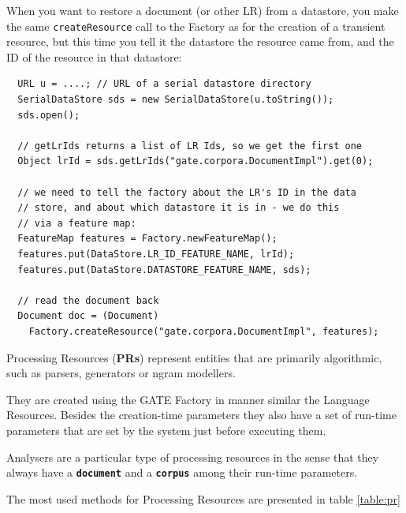 When you want to restore a document (or other LR) from a datastore, you make
the same {\tt createResource} call to the Factory as for the creation of a
transient resource, but this time you tell it the datastore the resource
came from, and the ID of the resource in that datastore:
\begin{lstlisting}
  URL u = ....; // URL of a serial datastore directory
  SerialDataStore sds = new SerialDataStore(u.toString());
  sds.open();

  // getLrIds returns a list of LR Ids, so we get the first one
  Object lrId = sds.getLrIds("gate.corpora.DocumentImpl").get(0);

  // we need to tell the factory about the LR's ID in the data
  // store, and about which datastore it is in - we do this
  // via a feature map:
  FeatureMap features = Factory.newFeatureMap();
  features.put(DataStore.LR_ID_FEATURE_NAME, lrId);
  features.put(DataStore.DATASTORE_FEATURE_NAME, sds);

  // read the document back
  Document doc = (Document)
    Factory.createResource("gate.corpora.DocumentImpl", features);
\end{lstlisting}




Processing Resources ({\bf PRs}) represent entities that are primarily
algorithmic, such as parsers, generators or ngram modellers.

They are created using the GATE Factory in manner similar the
Language Resources. Besides the creation-time parameters they also
have a set of run-time parameters that are set by the system just
before executing them.

Analysers are a particular type of processing resources in the sense that
they always have a {\bf {\tt document}} and a {\bf {\tt corpus}} among their
run-time parameters.

The most used methods for Processing Resources are presented in table
\ref{table:pr}


